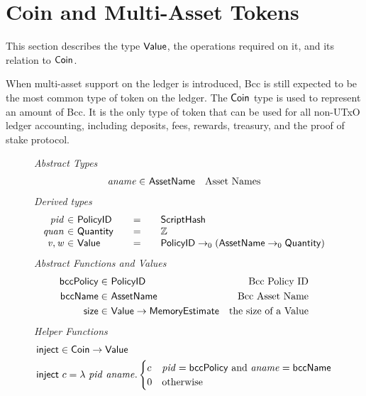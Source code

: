 \section{Coin and Multi-Asset Tokens}
\label{sec:coin-ma}

This section describes the type $\mathsf{Value}$, the operations required on
it, and its relation to $\mathsf{Coin}$.

When multi-asset support on the ledger is introduced, Bcc is still expected to be
the most common type of token on the ledger.
The $\mathsf{Coin}$ type is used to represent an amount of Bcc.
It is the only
type of token that can be used for all non-UTxO ledger accounting, including deposits,
fees, rewards, treasury, and the proof of stake protocol.

\begin{figure*}[t!]
  \emph{Abstract Types}
  \begin{align*}
    \mathit{aname} \in& ~\mathsf{AssetName} & \text{Asset Names}
  \end{align*}
  \emph{Derived types}
  \begin{equation*}
    \begin{array}{r@{~\in~}l@{\qquad=\qquad}lr}
      \var{pid} & \PolicyID & \ScriptHash \\
      \var{quan} & \Quantity & \Z \\
      \var{v}, \var{w} & \Value
      & \PolicyID \to_0 ( \AssetName \to_0 \Quantity )
    \end{array}
  \end{equation*}
  \emph{Abstract Functions and Values}
  \begin{align*}
    \mathsf{bccPolicy} \in& ~\mathsf{PolicyID} & \text{Bcc Policy ID} \\
    \mathsf{bccName} \in& ~\mathsf{AssetName} & \text{Bcc Asset Name} \\
    \mathsf{size} \in& ~\mathsf{Value}\to\mathsf{MemoryEstimate} & \text{the size of a Value}
  \end{align*}
  \emph{Helper Functions}
  \begin{align*}
    & \fun{inject} \in \Coin\to \Value \\
    & \fun{inject}~c = \lambda~\var{pid}~\var{aname}.
      \begin{cases}
        c & \var{pid} = \mathsf{bccPolicy}~\text{and}~\var{aname} = \mathsf{bccName} \\
        0 & \text{otherwise}
      \end{cases}

\end{align*}
\end{figure*}
